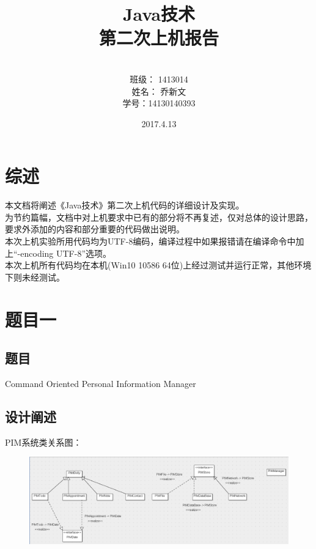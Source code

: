 \documentclass[a4paper]{article}
\begin{document}
\title{\Huge Java技术\\ 第二次上机报告}
\author { \vspace{12cm} \\ \LARGE 班级：  1413014  \\ \LARGE 姓名：  乔新文   \\ \LARGE 学号：14130140393} 
\date{ \vspace{4cm} 2017.4.13}

\maketitle
\clearpage

\tableofcontents

\clearpage

\section{综述}

本文档将阐述《Java技术》第二次上机代码的详细设计及实现。\\

为节约篇幅，文档中对上机要求中已有的部分将不再复述，仅对总体的设计思路，要求外添加的内容和部分重要的代码做出说明。\\

本次上机实验所用代码均为UTF-8编码，编译过程中如果报错请在编译命令中加上“-encoding UTF-8”选项。\\

本次上机所有代码均在本机(Win10 10586 64位)上经过测试并运行正常，其他环境下则未经测试。

\section{题目一}

\subsection{题目}

Command Oriented Personal Information Manager

\subsection{设计阐述}

PIM系统类关系图：\\
\begin{figure}[h]
    \centering
    \includegraphics[width=16cm]{classall.png}\\
\end{figure}
\end{document}
